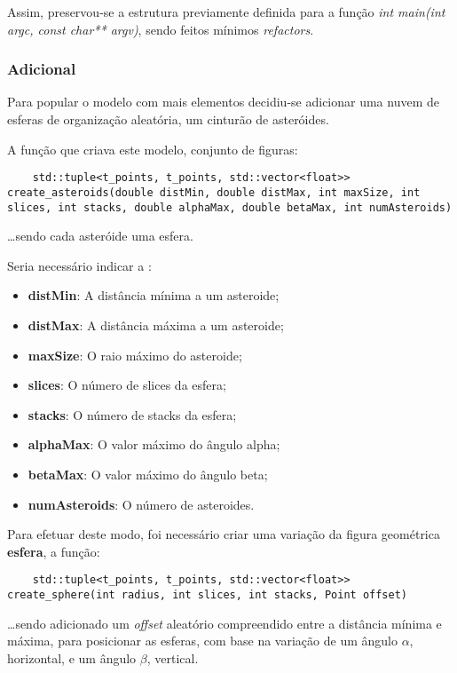 \documentclass[relatorio.tex]{subfiles}
\begin{document}
Assim, preservou-se a estrutura previamente definida 
para a função \textit{int main(int argc, const char** argv)},
sendo feitos mínimos \textit{refactors}.

\subsubsection{Adicional} \label{subsec:aster}

Para popular o modelo com mais elementos decidiu-se 
adicionar uma nuvem de esferas de organização aleatória,
um cinturão de asteróides. 

A função que criava este modelo, conjunto de figuras:
\begin{verbatim}
    std::tuple<t_points, t_points, std::vector<float>> create_asteroids(double distMin, double distMax, int maxSize, int slices, int stacks, double alphaMax, double betaMax, int numAsteroids)
\end{verbatim}
\dots sendo cada asteróide uma esfera.

Seria necessário indicar a :
\begin{itemize}
    \item \textbf{distMin}: A distância mínima a um asteroide;
    \item \textbf{distMax}: A distância máxima a um asteroide;
    \item \textbf{maxSize}: O raio máximo do asteroide;
    \item \textbf{slices}: O número de slices da esfera;
    \item \textbf{stacks}: O número de stacks da esfera;
    \item \textbf{alphaMax}: O valor máximo do ângulo alpha;
    \item \textbf{betaMax}: O valor máximo do ângulo beta;
    \item \textbf{numAsteroids}: O número de asteroides.
\end{itemize}

Para efetuar deste modo, foi necessário criar uma variação 
da figura geométrica \textbf{esfera}, a função:

\begin{verbatim}
    std::tuple<t_points, t_points, std::vector<float>> create_sphere(int radius, int slices, int stacks, Point offset)
\end{verbatim}
\dots sendo adicionado um \textit{offset} aleatório compreendido
entre a distância mínima e máxima, para posicionar as esferas,
com base na variação de um ângulo $\alpha$, horizontal,
e um ângulo $\beta$, vertical.
\end{document}
